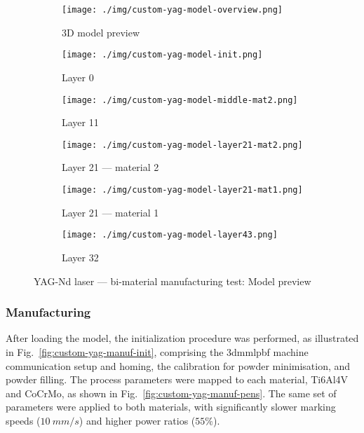 \begin{figure}[htbp!]
  \centering
  \begin{subfigure}[t]{0.48\textwidth}
  \centering
  \texttt{[image: ./img/custom-yag-model-overview.png]}
  \caption{3D model preview}%
  \label{fig:custom-yag-model-overview}
  \end{subfigure}
%
  \begin{subfigure}[t]{0.48\textwidth}
  \centering
  \texttt{[image: ./img/custom-yag-model-init.png]}
  \caption{Layer 0}%
  \label{fig:custom-yag-model-init}
\end{subfigure}
  \begin{subfigure}[t]{0.48\textwidth}
  \centering
  \texttt{[image: ./img/custom-yag-model-middle-mat2.png]}
  \caption{Layer 11}%
  \label{fig:custom-yag-model-layer11}
\end{subfigure}
  \begin{subfigure}[t]{0.48\textwidth}
  \centering
  \texttt{[image: ./img/custom-yag-model-layer21-mat2.png]}
  \caption{Layer 21 --- material 2}%
  \label{fig:custom-yag-model-layer21-mat2}
\end{subfigure}
  \begin{subfigure}[t]{0.48\textwidth}
  \centering
  \texttt{[image: ./img/custom-yag-model-layer21-mat1.png]}
  \caption{Layer 21 --- material 1}%
  \label{fig:custom-yag-model-layer21-mat1}
\end{subfigure}
  \begin{subfigure}[t]{0.48\textwidth}
  \centering
  \texttt{[image: ./img/custom-yag-model-layer43.png]}
  \caption{Layer 32}%
  \label{fig:custom-yag-model-layer43}
\end{subfigure}
%
  \caption{YAG-Nd laser --- bi-material manufacturing test: Model preview}%
  \label{fig:custom-yag-model-preview}
\end{figure}

\subsubsection{Manufacturing}%
\label{sec:manufacturing-yag}
After loading the model, the initialization procedure was performed, as
illustrated in Fig.~\ref{fig:custom-yag-manuf-init}, comprising the
\gls{3dmmlpbf} machine communication setup and homing, the calibration for
powder minimisation, and powder filling.
The process parameters
were mapped to each material, Ti6Al4V and CoCrMo, as shown in
Fig.~\ref{fig:custom-yag-manuf-pens}. The same set of parameters were applied to
both materials, with significantly slower marking speeds ($10~mm/s$) and higher
power ratios ($55\%$).

